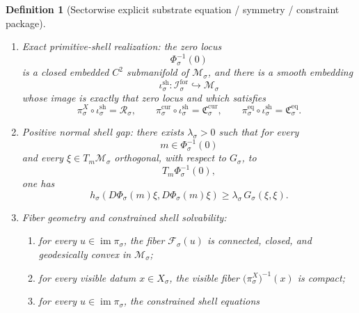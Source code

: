 \documentclass[11pt]{article}
\newcommand{\ForSpace}[1]{\mathcal I_{#1}^{\mathrm{for}}}
\newcommand{\Reduction}[1]{\mathcal R_{#1}}
\newcommand{\CurrentCarrier}[1]{\mathfrak C_{#1}^{\mathrm{cur}}}
\newcommand{\EqCarrier}[1]{\mathfrak C_{#1}^{\mathrm{eq}}}
\newcommand{\SubSpace}[1]{\mathcal M_{#1}}
\newcommand{\SubMetric}[1]{G_{#1}}
\newcommand{\DataProj}[1]{\pi_{#1}}
\newcommand{\SubVisible}[1]{\pi_{#1}^{X}}
\newcommand{\SubCurrent}[1]{\pi_{#1}^{\mathrm{cur}}}
\newcommand{\SubEq}[1]{\pi_{#1}^{\mathrm{eq}}}
\newcommand{\SubTargetMetric}[1]{h_{#1}}
\newcommand{\ShellEquation}[1]{\Phi_{#1}}
\newcommand{\Fiber}[1]{\mathcal F_{#1}}
\newcommand{\ShellEmbed}[1]{\iota_{#1}^{\mathrm{sh}}}
\newcommand{\StationaryFunctional}[1]{\mathscr A_{#1}}
\newcommand{\TimeRev}[1]{\tau_{#1}}
\newtheorem{definition}{Definition}
\begin{document}
\begin{definition}[Sectorwise explicit substrate equation / symmetry / constraint package]
\begin{enumerate}
    \[
    \ShellEquation{\sigma}\circ\TimeRev{\sigma}
    =
    \ShellEquation{\sigma}.
    \]
    Define the associated norm-square stationary functional by
    \begin{equation}
    \StationaryFunctional{\sigma}(m)
    \equiv
    \frac12\,
    \SubTargetMetric{\sigma}\bigl(
    \ShellEquation{\sigma}(m),
    \ShellEquation{\sigma}(m)
    \bigr).
    \label{eq:functional}
    \end{equation}
    \item Exact primitive-shell realization: the zero locus
    \[
    \ShellEquation{\sigma}^{-1}(0)
    \]
    is a closed embedded \(C^{2}\) submanifold of \(\SubSpace{\sigma}\), and there is a smooth embedding
    \[
    \ShellEmbed{\sigma}:\ForSpace{\sigma}\hookrightarrow\SubSpace{\sigma}
    \]
    whose image is exactly that zero locus and which satisfies
    \begin{equation}
    \SubVisible{\sigma}\circ\ShellEmbed{\sigma}
    =
    \Reduction{\sigma},
    \qquad
    \SubCurrent{\sigma}\circ\ShellEmbed{\sigma}
    =
    \CurrentCarrier{\sigma},
    \qquad
    \SubEq{\sigma}\circ\ShellEmbed{\sigma}
    =
    \EqCarrier{\sigma}.
    \label{eq:embedcompat}
    \end{equation}
    \item Positive normal shell gap: there exists \(\lambda_{\sigma}>0\) such that for every
    \[
    m\in\ShellEquation{\sigma}^{-1}(0)
    \]
    and every \(\xi\in T_m\SubSpace{\sigma}\) orthogonal, with respect to \(\SubMetric{\sigma}\), to
    \[
    T_m\ShellEquation{\sigma}^{-1}(0),
    \]
    one has
    \begin{equation}
    \SubTargetMetric{\sigma}\!\left(
    D\ShellEquation{\sigma}(m)\xi,
    D\ShellEquation{\sigma}(m)\xi
    \right)
    \ge
    \lambda_{\sigma}\,
    \SubMetric{\sigma}(\xi,\xi).
    \label{eq:normalgap}
    \end{equation}
    \item Fiber geometry and constrained shell solvability:
    \begin{enumerate}
        \item for every \(u\in\operatorname{im}\DataProj{\sigma}\), the fiber \(\Fiber{\sigma}(u)\) is connected, closed, and geodesically convex in \(\SubSpace{\sigma}\);
        \item for every visible datum \(x\in X_{\sigma}\), the visible fiber \(\bigl(\SubVisible{\sigma}\bigr)^{-1}(x)\) is compact;
        \item for every \(u\in\operatorname{im}\DataProj{\sigma}\), the constrained shell equations

\end{enumerate}
\end{enumerate}
\end{definition}
\end{document}
